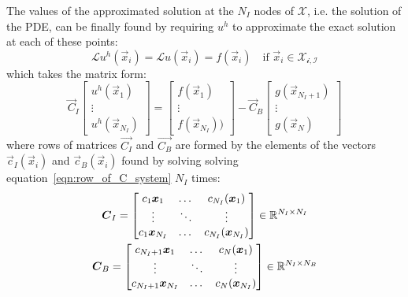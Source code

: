 The values of the approximated solution at the $N_I$ nodes of $\mathcal{X}$, i.e. the solution of the PDE, can be finally found by requiring $u^h$ to approximate the exact solution at each of these points:
\begin{equation}
	\mathcal{L}u^h(\vec{x}_i) = \mathcal{L}u(\vec{x}_i) = f(\vec{x}_i)  \quad  \text{if $\vec{x}_i \in \mathcal{X_{i,I}}$}
\end{equation}
which takes the matrix form:
\begin{equation}
\vec{C}_I
\begin{bmatrix}
	u^h(\vec{x}_1)  \\
	\vdots			\\
	u^h(\vec{x}_{N_I})
\end{bmatrix}
=
\begin{bmatrix}
	f(\vec{x}_1)  \\
	\vdots		  \\
	f(\vec{x}_{N_I}))
\end{bmatrix}
-
\vec{C}_B
\begin{bmatrix}
	g(\vec{x}_{N_I+1})  \\
	\vdots				\\
	g(\vec{x}_{N})
\end{bmatrix}
\end{equation}
where rows of matrices $\vec{C_I}$ and $\vec{C_B}$ are formed by the elements of the vectors $\vec{c}_I(\vec{x}_i)$ and $\vec{c}_B(\vec{x}_i)$ found by solving solving equation~\eqref{eqn:row_of_C_system} $N_I$ times:
\begin{equation}
	\begin{gathered}
		\boldsymbol{C}_I = \begin{bmatrix}
						c_1{\boldsymbol{x}_1}  	&  \dots  & c_{N_I}(\boldsymbol{x}_1)  	\\
						\vdots				& \ddots  & \vdots					\\
						c_1{\boldsymbol{x}_{N_I}}  &  \dots  & c_{N_I}(\boldsymbol{x}_{N_I})
					\end{bmatrix} \in \mathbb{R}^{N_I \times N_I}  \\
		\boldsymbol{C}_B = \begin{bmatrix}
						c_{N_I+1}{\boldsymbol{x}_1}  	  &  \dots  & c_{N}(\boldsymbol{x}_1)  	\\
						\vdots					  & \ddots  & \vdots				\\
						c_{N_I+1}{\boldsymbol{x}_{N_I}}  &  \dots  & c_{N}(\boldsymbol{x}_{N_I})
					\end{bmatrix} \in \mathbb{R}^{N_I \times N_B}
	\end{gathered}
\end{equation}










































